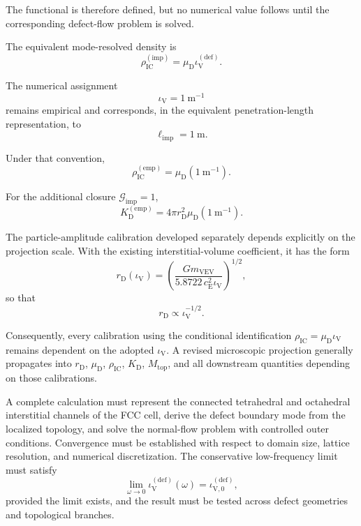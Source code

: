 The functional is therefore defined, but no numerical value follows until the corresponding defect-flow problem is solved.

The equivalent mode-resolved density is
\begin{equation}
    \rho_{\mathrm{IC}}^{(\mathrm{imp})} = \mu_{\mathrm{D}}\iota_{\mathrm{V}}^{(\mathrm{def})}.
\end{equation}

The numerical assignment
\begin{equation}
    \iota_{\mathrm{V}} = 1\ \mathrm{m}^{-1}
\end{equation}
remains empirical and corresponds, in the equivalent penetration-length representation, to
\begin{equation}
    \ell_{\mathrm{imp}} = 1\ \mathrm{m}.
\end{equation}

Under that convention,
\begin{equation}
    \rho_{\mathrm{IC}}^{(\mathrm{emp})} = \mu_{\mathrm{D}}\left(1\ \mathrm{m}^{-1}\right).
\end{equation}

For the additional closure $\mathcal{G}_{\mathrm{imp}}=1$,
\begin{equation}
    K_{\mathrm{D}}^{(\mathrm{emp})} = 4\pi r_{\mathrm{D}}^2\mu_{\mathrm{D}}\left(1\ \mathrm{m}^{-1}\right).
\end{equation}

The particle-amplitude calibration developed separately depends explicitly on the projection scale. With the existing interstitial-volume coefficient, it has the form
\begin{equation}
    r_{\mathrm{D}}(\iota_{\mathrm{V}}) = \left(\frac{Gm_{\mathrm{VEV}}}{5.8722\,c_{\mathrm{E}}^2\iota_{\mathrm{V}}}\right)^{1/2},
\end{equation}
so that
\begin{equation}
    r_{\mathrm{D}} \propto \iota_{\mathrm{V}}^{-1/2}.
\end{equation}

Consequently, every calibration using the conditional identification $\rho_{\mathrm{IC}} = \mu_{\mathrm{D}}\iota_{\mathrm{V}}$ remains dependent on the adopted $\iota_{\mathrm{V}}$. A revised microscopic projection generally propagates into $r_{\mathrm{D}}$, $\mu_{\mathrm{D}}$, $\rho_{\mathrm{IC}}$, $K_{\mathrm{D}}$, $M_{\mathrm{top}}$, and all downstream quantities depending on those calibrations.

A complete calculation must represent the connected tetrahedral and octahedral interstitial channels of the FCC cell, derive the defect boundary mode from the localized topology, and solve the normal-flow problem with controlled outer conditions. Convergence must be established with respect to domain size, lattice resolution, and numerical discretization. The conservative low-frequency limit must satisfy
\begin{equation}
    \lim_{\omega\rightarrow0}\iota_{\mathrm{V}}^{(\mathrm{def})}(\omega) = \iota_{\mathrm{V},0}^{(\mathrm{def})},
\end{equation}
provided the limit exists, and the result must be tested across defect geometries and topological branches.

